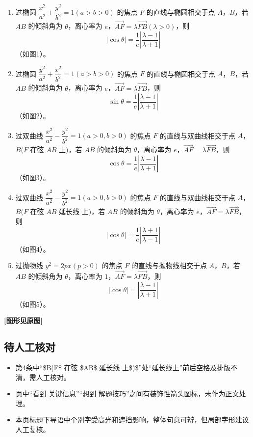 \documentclass[UTF8,a4paper,11pt]{ctexart}
\begin{document}
\begin{enumerate}
  \item 过椭圆 $\dfrac{x^2}{a^2}+\dfrac{y^2}{b^2}=1(a>b>0)$ 的焦点 $F$ 的直线与椭圆相交于点 $A$，$B$，若 $AB$ 的倾斜角为 $\theta$，离心率为 $e$，$\overrightarrow{AF}=\lambda\overrightarrow{FB}(\lambda>0)$，则
  \[
  |\cos\theta|=\frac{1}{e}\left|\frac{\lambda-1}{\lambda+1}\right|
  \]
  （如图1）。

  \item 过椭圆 $\dfrac{y^2}{a^2}+\dfrac{x^2}{b^2}=1(a>b>0)$ 的焦点 $F$ 的直线与椭圆相交于点 $A$，$B$，若 $AB$ 的倾斜角为 $\theta$，离心率为 $e$，$\overrightarrow{AF}=\lambda\overrightarrow{FB}$，则
  \[
  \sin\theta=\frac{1}{e}\left|\frac{\lambda-1}{\lambda+1}\right|
  \]
  （如图2）。

  \item 过双曲线 $\dfrac{x^2}{a^2}-\dfrac{y^2}{b^2}=1(a>0,b>0)$ 的焦点 $F$ 的直线与双曲线相交于点 $A$，$B(F$ 在弦 $AB$ 上$)$，若 $AB$ 的倾斜角为 $\theta$，离心率为 $e$，$\overrightarrow{AF}=\lambda\overrightarrow{FB}$，则
  \[
  \cos\theta=\frac{1}{e}\left|\frac{\lambda-1}{\lambda+1}\right|
  \]
  （如图3）。

  \item 过双曲线 $\dfrac{x^2}{a^2}-\dfrac{y^2}{b^2}=1(a>0,b>0)$ 的焦点 $F$ 的直线与双曲线相交于点 $A$，$B(F$ 在弦 $AB$ 延长线 上$)$，若 $AB$ 的倾斜角为 $\theta$，离心率为 $e$，$\overrightarrow{AF}=\lambda\overrightarrow{FB}$，则
  \[
  |\cos\theta|=\frac{1}{e}\left|\frac{\lambda+1}{\lambda-1}\right|
  \]
  （如图4）。

  \item 过抛物线 $y^2=2px(p>0)$ 的焦点 $F$ 的直线与抛物线相交于点 $A$，$B$，若 $AB$ 的倾斜角为 $\theta$，离心率为 $1$，$\overrightarrow{AF}=\lambda\overrightarrow{FB}$，则
  \[
  |\cos\theta|=\left|\frac{\lambda-1}{\lambda+1}\right|
  \]
  （如图5）。
\end{enumerate}

\textbf{[图形见原图]}

\subsection*{待人工核对}

\begin{itemize}

\item 第4条中“\$B(F\$ 在弦 \$AB\$ 延长线 上\$)\$”处“延长线上”前后空格及排版不清，需人工核对。

\item 页中“看到 关键信息”“想到 解题技巧”之间有装饰性箭头图标，未作为正文处理。

\item 本页标题下导语中个别字受高光和遮挡影响，整体句意可辨，但局部字形建议人工复核。

\end{itemize}
\end{document}
